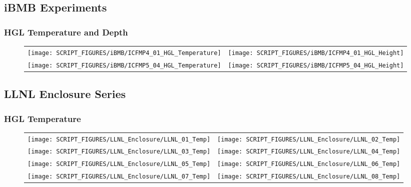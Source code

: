\clearpage

\subsection{iBMB Experiments}

\subsubsection{HGL Temperature and Depth}

\begin{figure}[!ht]
\begin{tabular*}{\textwidth}{l@{\extracolsep{\fill}}r}
\texttt{[image: SCRIPT\_FIGURES/iBMB/ICFMP4\_01\_HGL\_Temperature]} &
\texttt{[image: SCRIPT\_FIGURES/iBMB/ICFMP4\_01\_HGL\_Height]} \\
\texttt{[image: SCRIPT\_FIGURES/iBMB/ICFMP5\_04\_HGL\_Temperature]} &
\texttt{[image: SCRIPT\_FIGURES/iBMB/ICFMP5\_04\_HGL\_Height]} 
\end{tabular*}
\end{figure}

\clearpage

\subsection{LLNL Enclosure Series}

\subsubsection{HGL Temperature}

\begin{figure}[!ht]
\begin{tabular*}{\textwidth}{l@{\extracolsep{\fill}}r}
\texttt{[image: SCRIPT\_FIGURES/LLNL\_Enclosure/LLNL\_01\_Temp]} &
\texttt{[image: SCRIPT\_FIGURES/LLNL\_Enclosure/LLNL\_02\_Temp]} \\
\texttt{[image: SCRIPT\_FIGURES/LLNL\_Enclosure/LLNL\_03\_Temp]} &
\texttt{[image: SCRIPT\_FIGURES/LLNL\_Enclosure/LLNL\_04\_Temp]} \\
\texttt{[image: SCRIPT\_FIGURES/LLNL\_Enclosure/LLNL\_05\_Temp]} &
\texttt{[image: SCRIPT\_FIGURES/LLNL\_Enclosure/LLNL\_06\_Temp]} \\
\texttt{[image: SCRIPT\_FIGURES/LLNL\_Enclosure/LLNL\_07\_Temp]} &
\texttt{[image: SCRIPT\_FIGURES/LLNL\_Enclosure/LLNL\_08\_Temp]}
\end{tabular*}
\label{LLNL_Enclosure_Temp_1}
\end{figure}


